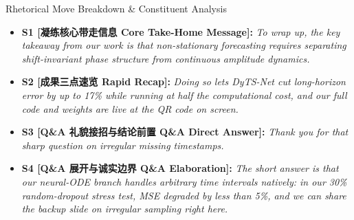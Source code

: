 \begin{TipBox}{Rhetorical Move Breakdown \& Constituent Analysis}
\begin{itemize}[leftmargin=1.5em]
  \item \textbf{S1 [凝练核心带走信息 Core Take-Home Message]:} \textit{To wrap up, the key takeaway from our work is that non-stationary forecasting requires separating shift-invariant phase structure from continuous amplitude dynamics.}\par{}
  \item \textbf{S2 [成果三点速览 Rapid Recap]:} \textit{Doing so lets DyTS-Net cut long-horizon error by up to 17\% while running at half the computational cost, and our full code and weights are live at the QR code on screen.}\par{}
  \item \textbf{S3 [Q\&A 礼貌接招与结论前置 Q\&A Direct Answer]:} \textit{Thank you for that sharp question on irregular missing timestamps.}\par{}
  \item \textbf{S4 [Q\&A 展开与诚实边界 Q\&A Elaboration]:} \textit{The short answer is that our neural-ODE branch handles arbitrary time intervals natively: in our 30\% random-dropout stress test, MSE degraded by less than 5\%, and we can share the backup slide on irregular sampling right here.}\par{}
\end{itemize}
\end{TipBox}
\medskip
